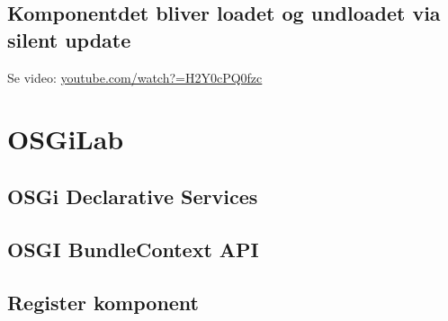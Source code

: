 \subsection{Komponentdet bliver loadet og undloadet via silent update}
Se video: \href{https://www.youtube.com/watch?v=H2Y0cPQ0fzc}{youtube.com/watch?=H2Y0cPQ0fzc}


\newpage
\section{OSGiLab}

\subsection{OSGi Declarative Services}
\subsection{OSGI BundleContext API}


\subsection{Register komponent}

